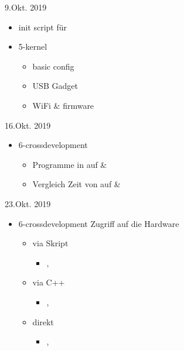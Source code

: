 \documentclass{beamer}
\begin{document}
\begin{frame}{9.Okt. 2019}
 \begin{itemize}
  \item init script für \targetS
  \item 5-kernel
  \begin{itemize}
   \item basic config
   \item USB Gadget
   \item WiFi \& firmware
  \end{itemize}
 \end{itemize}
\end{frame}

\begin{frame}{16.Okt. 2019}
 \begin{itemize}
  \item 6-crossdevelopment
  \begin{itemize}
   \item Programme in  auf \host \& \targetS
   \item Vergleich Zeit von  auf \host \& \targetS
  \end{itemize}
 \end{itemize}
\end{frame}

\begin{frame}{23.Okt. 2019}
 \begin{itemize}
  \item 6-crossdevelopment Zugriff auf die Hardware
  \begin{itemize}
   \item via Skript 
   \begin{itemize}
    \item {}, 
   \end{itemize}
   \item via C++ 
   \begin{itemize}
    \item {}, 
   \end{itemize}
   \item direkt 
   \begin{itemize}
    \item {}, 
   \end{itemize}
  \end{itemize}
 \end{itemize}
\end{frame}
\end{document}
